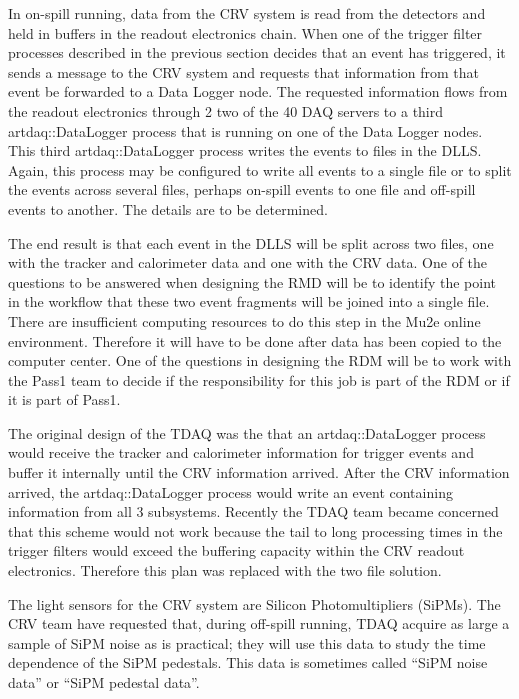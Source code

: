 In on-spill running,
data from the CRV system is read from the detectors and held in buffers in the
readout electronics chain.
When one of the trigger filter processes described in the previous section
decides that an event has triggered,
it sends a message to the CRV system and requests that information from that
event be forwarded to a Data Logger node.
The requested information flows from the readout electronics through 2 two of the 40 DAQ servers
to a third {\code artdaq::DataLogger} process that is running on one of the Data Logger nodes.
This third {\code artdaq::DataLogger} process writes the events to files in the DLLS.
Again, this process may be configured to write all events to a single file
or to split the events across several files,
perhaps on-spill events to one file and off-spill events to another.
The details are to be determined.


The end result is that each event in the DLLS will be split across two files, one with the
tracker and calorimeter data and one with the CRV data.
One of the questions to be answered when designing the RMD will be to identify
the point in the workflow that these two event fragments will be joined into a single file.
There are insufficient computing resources to do this step in the Mu2e online environment.
Therefore it will have to be done after data has been copied to the computer center.
One of the questions in designing the RDM will be to work with the Pass1 team to
decide if the responsibility for this job is part of the RDM or if it is part of Pass1.

The original design of the TDAQ was the that an {\code artdaq::DataLogger} process
would receive the tracker and calorimeter information for trigger events
and buffer it internally until the CRV information arrived.
After the CRV information arrived,
the {\code artdaq::DataLogger} process would write an event containing information from all 3 subsystems.
Recently the TDAQ team became concerned that this scheme would not work because
the tail to long processing times in the trigger filters would exceed the buffering capacity within
the CRV readout electronics.
Therefore this plan was replaced with the two file solution.


The light sensors for the CRV system are Silicon Photomultipliers (SiPMs).
The CRV team have requested that, during off-spill running,
TDAQ acquire as large a sample of SiPM noise as is practical;
they will use this data to study the time dependence of the SiPM pedestals.
This data is sometimes called ``SiPM noise data'' or ``SiPM pedestal data''.

